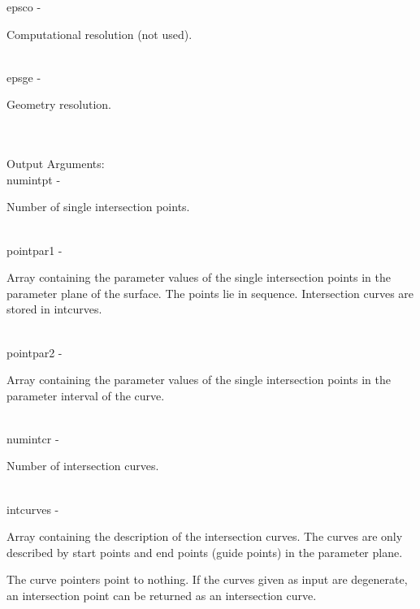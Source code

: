         \>\>    {\fov epsco}\> - \>     \begin{minipg2}
                                Computational resolution (not used).
                                \end{minipg2}\\
        \>\>    {\fov epsge}\> - \>     \begin{minipg2}
                                Geometry resolution.
                                \end{minipg2} \\
\\
        \>Output Arguments:\\
        \>\>    {\fov numintpt}\> - \>  \begin{minipg2}
                                Number of single intersection points.
                                \end{minipg2}\\
        \>\>    {\fov pointpar1}\> - \>\begin{minipg2}
                                Array containing the parameter values of the
                                single intersection points in the parameter
                                plane of the surface. The points lie
                                in sequence. Intersection curves are stored in
                                intcurves.
                                \end{minipg2}\\[0.8ex]
        \>\>    {\fov pointpar2}\> - \>\begin{minipg2}
                                Array containing the parameter values of the
                                single intersection points in the parameter
                                interval of the curve.
                                \end{minipg2}\\[0.8ex]
        \>\>    {\fov numintcr}\> - \>  \begin{minipg2}
                                Number of intersection curves.
                                \end{minipg2}\\
        \>\>    {\fov intcurves}\> - \>\begin{minipg2}
                                Array containing the description of the intersection
                                curves. The curves are only described by
                                start points and end points (guide points) in
                                the parameter plane.

                         The curve pointers point to
                                nothing.
                                If the curves given as input are
                                degenerate, an intersection point can be returned
                                as an intersection curve.
                                \end{minipg2}\\[0.8ex]
